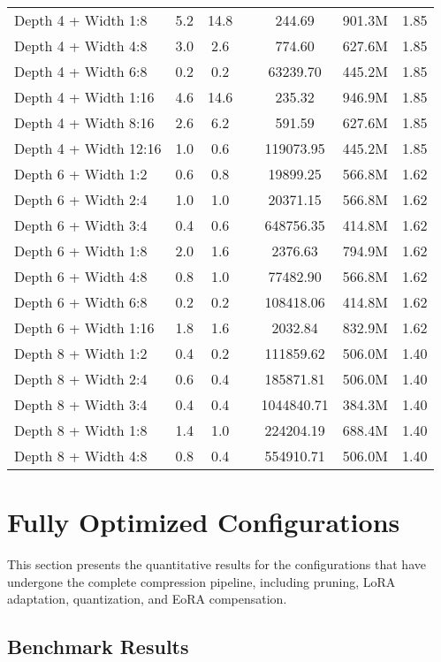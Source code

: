 {\begin{longtable}{lcccccc}
Depth 4 + Width 1:8 & 5.2 & 14.8 & & 244.69 & 901.3M & 1.85 \\
Depth 4 + Width 4:8 & 3.0 & 2.6 & & 774.60 & 627.6M & 1.85 \\
Depth 4 + Width 6:8 & 0.2 & 0.2 & & 63239.70 & 445.2M & 1.85 \\
Depth 4 + Width 1:16 & 4.6 & 14.6 & & 235.32 & 946.9M & 1.85 \\
Depth 4 + Width 8:16 & 2.6 & 6.2 & & 591.59 & 627.6M & 1.85 \\
Depth 4 + Width 12:16 & 1.0 & 0.6 & & 119073.95 & 445.2M & 1.85 \\
Depth 6 + Width 1:2 & 0.6 & 0.8 & & 19899.25 & 566.8M & 1.62 \\
Depth 6 + Width 2:4 & 1.0 & 1.0 & & 20371.15 & 566.8M & 1.62 \\
Depth 6 + Width 3:4 & 0.4 & 0.6 & & 648756.35 & 414.8M & 1.62 \\
Depth 6 + Width 1:8 & 2.0 & 1.6 & & 2376.63 & 794.9M & 1.62 \\
Depth 6 + Width 4:8 & 0.8 & 1.0 & & 77482.90 & 566.8M & 1.62 \\
Depth 6 + Width 6:8 & 0.2 & 0.2 & & 108418.06 & 414.8M & 1.62 \\
Depth 6 + Width 1:16 & 1.8 & 1.6 & & 2032.84 & 832.9M & 1.62 \\
Depth 8 + Width 1:2 & 0.4 & 0.2 & & 111859.62 & 506.0M & 1.40 \\
Depth 8 + Width 2:4 & 0.6 & 0.4 & & 185871.81 & 506.0M & 1.40 \\
Depth 8 + Width 3:4 & 0.4 & 0.4 & & 1044840.71 & 384.3M & 1.40 \\
Depth 8 + Width 1:8 & 1.4 & 1.0 & & 224204.19 & 688.4M & 1.40 \\
Depth 8 + Width 4:8 & 0.8 & 0.4 & & 554910.71 & 506.0M & 1.40 \\
\end{longtable}
}
\normalsize

\section{Fully Optimized Configurations}

This section presents the quantitative results for the configurations that have undergone the complete compression pipeline, including pruning, LoRA adaptation, quantization, and EoRA compensation.

\subsection{Benchmark Results}


